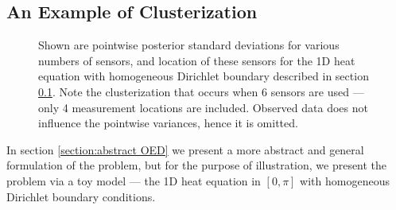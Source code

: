 \documentclass{amsart}
\numberwithin{equation}{section}
\begin{document}
\subsection{An Example of Clusterization}\label{subsec:example}
\begin{figure}
  \caption{Shown are pointwise posterior standard deviations for
    various numbers of sensors, and location of these sensors for the
    1D heat equation with  homogeneous Dirichlet boundary described in
    section \ref{subsec:example}. Note the clusterization that occurs
    when 6 sensors are used --- only 4 measurement locations are
    included. Observed data does not influence the pointwise
    variances, hence it is omitted.}
\end{figure}\label{fig:clusterization illustration}
In section \ref{section:abstract OED} we present a more abstract and
general formulation of the problem, but for the purpose of
illustration, we present the problem via a toy model --- the 1D heat
equation in $[0,\pi]$ with  homogeneous Dirichlet boundary
conditions.
\end{document}
